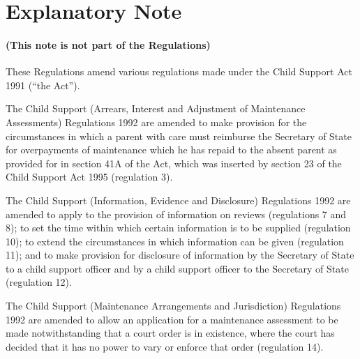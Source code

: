 \documentclass[a4paper]{article}
\newcommand{\parthead}{}
\begin{document}
\part{Explanatory Note}

\renewcommand\parthead{--- Explanatory Note}

\subsection*{(This note is not part of the Regulations)}

 These Regulations amend various regulations made under the Child Support Act 1991 (“the Act”).

  The Child Support (Arrears, Interest and Adjustment of Maintenance Assessments) Regulations 1992 are amended to make provision for the circumstances in which a parent with care must reimburse the Secretary of State for overpayments of maintenance which he has repaid to the absent parent as provided for in section 41A of the Act, which was inserted by section 23 of the Child Support Act 1995 (regulation 3).

  The Child Support (Information, Evidence and Disclosure) Regulations 1992 are amended to apply to the provision of information on reviews (regulations 7 and 8); to set the time within which certain information is to be supplied (regulation 10); to extend the circumstances in which information can be given (regulation 11); and to make provision for disclosure of information by the Secretary of State to a child support officer and by a child support officer to the Secretary of State (regulation 12).

  The Child Support (Maintenance Arrangements and Jurisdiction) Regulations 1992 are amended to allow an application for a maintenance assessment to be made notwithstanding that a court order is in existence, where the court has decided that it has no power to vary or enforce that order (regulation 14).
\end{document}
